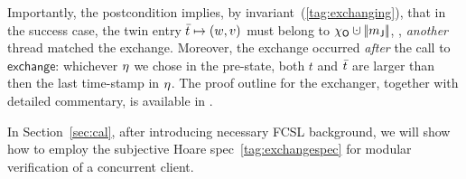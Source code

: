 Importantly, the postcondition implies, by
invariant~(\ref{tag:exchanging}), that in the success case, the twin
entry $\bar{t} \mapsto (w, v)$ must belong to $\histo \hunion
\mygather{\pending}$, \ie, \emph{another} thread matched the exchange.
Moreover, the exchange occurred \emph{after} the call to
$\mathsf{exchange}$: whichever $\eta$ we chose in the pre-state, both
$t$ and $\bar{t}$ are larger than then the last time-stamp in $\eta$.
%
The proof outline for the exchanger, together with detailed
commentary, is available in 
%
.

In Section~\ref{sec:cal}, after introducing necessary FCSL background,
we will show how to employ the subjective Hoare
spec~\eqref{tag:exchangespec} for modular verification of a concurrent
client.

